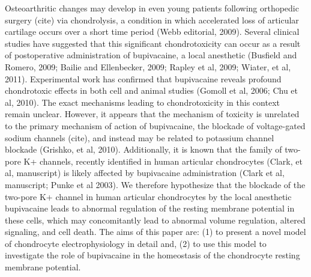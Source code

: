Osteoarthritic changes may develop in even young patients following
orthopedic surgery (cite) via chondrolysis, a condition in which
accelerated loss of articular cartilage occurs over a short time
period (Webb editorial, 2009).  Several clinical studies have
suggested that this significant chondrotoxicity can occur as a result
of postoperative administration of bupivacaine, a local anesthetic
(Busfield and Romero, 2009; Bailie and Ellenbecker, 2009; Rapley et
al, 2009; Wiater, et al, 2011).  Experimental work has confirmed that
bupivacaine reveals profound chondrotoxic effects in both cell
\citep{Chuetal2006} and animal studies (Gomoll et al, 2006; Chu et al,
2010).  The exact mechanisms leading to chondrotoxicity in this
context remain unclear.  However, it appears that the mechanism of
toxicity is unrelated to the primary mechanism of action of
bupivacaine, the blockade of voltage-gated sodium channels (cite), and
instead may be related to potassium channel blockade (Grishko, et al,
2010).  Additionally, it is known that the family of two-pore K+
channels, recently identified in human articular chondrocytes (Clark,
et al, manuscript) is likely affected by bupivacaine administration
(Clark et al, manuscript; Punke et al 2003).  We therefore hypothesize
that the blockade of the two-pore K+ channel in human articular
chondrocytes by the local anesthetic bupivacaine leads to abnormal
regulation of the resting membrane potential in these cells, which may
concomitantly lead to abnormal volume regulation, altered signaling,
and cell death.  The aims of this paper are: (1) to present a novel
model of chondrocyte electrophysiology in detail and, (2) to use this
model to investigate the role of bupivacaine in the homeostasis of the
chondrocyte resting membrane potential.

